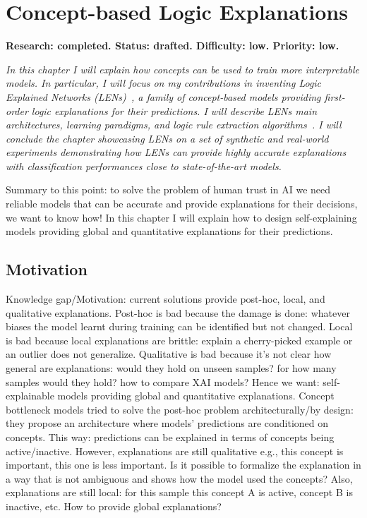 \chapter{Concept-based Logic Explanations} 
\label{chapter:lens}
\textbf{Research: completed. Status: drafted. Difficulty: low. Priority: low.}

\textit{In this chapter I will explain how concepts can be used to train more interpretable models. In particular, I will focus on my contributions in inventing Logic Explained Networks (LENs)~\citep{ciravegna2021logic}, a family of concept-based models providing first-order logic explanations for their predictions. I will describe LENs main architectures, learning paradigms, and logic rule extraction algorithms~\citep{barbiero2021entropy}. I will conclude the chapter showcasing LENs on a set of synthetic and real-world experiments demonstrating how LENs can provide highly accurate explanations with classification performances close to state-of-the-art models.}


Summary to this point: to solve the problem of human trust in AI we need reliable models that can be accurate and provide explanations for their decisions, we want to know how! In this chapter I will explain how to design self-explaining models providing global and quantitative explanations for their predictions.

\section{Motivation}

Knowledge gap/Motivation: current solutions provide post-hoc, local, and qualitative explanations. Post-hoc is bad because the damage is done: whatever biases the model learnt during training can be identified but not changed. Local is bad because local explanations are brittle: explain a cherry-picked example or an outlier does not generalize. Qualitative is bad because it's not clear how general are explanations: would they hold on unseen samples? for how many samples would they hold? how to compare XAI models? Hence we want: self-explainable models providing global and quantitative explanations. Concept bottleneck models tried to solve the post-hoc problem architecturally/by design: they propose an architecture where models' predictions are conditioned on concepts. This way: predictions can be explained in terms of concepts being active/inactive. However, explanations are still qualitative e.g., this concept is important, this one is less important. Is it possible to formalize the explanation in a way that is not ambiguous and shows how the model used the concepts? Also, explanations are still local: for this sample this concept A is active, concept B is inactive, etc. How to provide global explanations?

